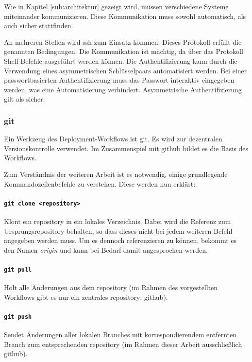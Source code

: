 Wie in Kapitel \ref{sub:architektur} gezeigt wird, müssen verschiedene Systeme miteinander kommunizieren. Diese Kommunikation muss sowohl automatisch, als auch sicher stattfinden.

An mehreren Stellen wird \gls{ssh} zum Einsatz kommen. Dieses Protokoll erfüllt die genannten Bedingungen. Die Kommunikation ist mächtig, da über das Protokoll Shell-Befehle ausgeführt werden können. Die Authentifizierung kann durch die Verwendung eines asymmetrischen Schlüsselpaars automatisiert werden. Bei einer passwortbasierten Authentifizierung muss das Passwort interaktiv eingegeben werden, was eine Automatisierung verhindert. Asymmetrische Authentifizierung gilt als sicher.\cite{asymmetric_crypto}


\subsubsection{git} %
\label{ssub:git}

Ein Werkzeug des Deployment-Workflows ist \gls{git}. Es wird zur dezentralen Versionskontrolle verwendet. Im Zusammenspiel mit \gls{github} bildet es die Basis des Workflows.

Zum Verständnis der weiteren Arbeit ist es notwendig, einige grundlegende Kommandozeilenbefehle zu verstehen. Diese werden nun erklärt:

\paragraph{\lstinline!git clone <repository>!} %
\label{par:git_clone}
Klont ein \gls{repository} in ein lokales Verzeichnis. Dabei wird die Referenz zum Ursprungsrepository behalten, so dass dieses nicht bei jedem weiteren Befehl angegeben werden muss. Um es dennoch referenzieren zu können, bekommt es den Namen \emph{origin} und kann bei Bedarf damit angesprochen werden.

\paragraph{\lstinline!git pull!} %
\label{par:git_pull}
Holt alle Änderungen aus dem \gls{repository} (im Rahmen des vorgestellten Workflows gibt es nur ein zentrales \gls{repository}: \gls{github}).

\paragraph{\lstinline!git push!} %
\label{par:git_push}
Sendet Änderungen aller lokalen Branches mit korrespondierendem entfernten Branch zum entsprechenden \gls{repository} (im Rahmen dieser Arbeit ausschließlich \gls{github}).

